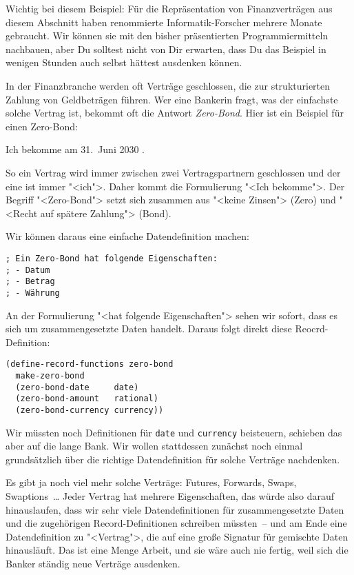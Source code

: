 Wichtig bei diesem Beispiel: Für die Repräsentation von
Finanzverträgen aus diesem Abschnitt haben renommierte
Informatik-Forscher mehrere Monate gebraucht.  Wir können sie mit den
bisher präsentierten Programmiermitteln nachbauen, aber Du solltest
nicht von Dir erwarten, dass Du das Beispiel in wenigen Stunden auch
selbst hättest ausdenken können.

In der Finanzbranche werden oft Verträge geschlossen, die zur
strukturierten Zahlung von Geldbeträgen führen.  Wer eine Bankerin
fragt, was der einfachste solche Vertrag ist, bekommt oft die Antwort
\textit{Zero-Bond}.  Hier ist ein Beispiel für einen Zero-Bond:
%
\begin{center}
  Ich bekomme am 31.\ Juni 2030 .
\end{center}
%
So ein Vertrag wird immer zwischen zwei Vertragspartnern geschlossen und der
eine ist immer "<ich">.  Daher kommt die Formulierung "<Ich
bekomme">.  Der Begriff "<Zero-Bond"> setzt sich zusammen aus "<keine
Zinsen"> (Zero) und "<Recht auf spätere Zahlung"> (Bond).

Wir können daraus eine einfache Datendefinition machen:
%
\begin{lstlisting}
; Ein Zero-Bond hat folgende Eigenschaften:
; - Datum
; - Betrag
; - Währung
\end{lstlisting}
%
An der Formulierung "<hat folgende Eigenschaften"> sehen wir sofort,
dass es sich um zusammengesetzte Daten handelt.  Daraus folgt direkt
diese Reocrd-Definition:
%
\begin{lstlisting}
(define-record-functions zero-bond
  make-zero-bond
  (zero-bond-date     date)
  (zero-bond-amount   rational)
  (zero-bond-currency currency))
\end{lstlisting}
%
Wir müssten noch Definitionen für \texttt{date} und \texttt{currency}
beisteuern, schieben das aber auf die lange Bank.  Wir wollen
stattdessen zunächst noch einmal grundsätzlich über die richtige
Datendefinition für solche Verträge nachdenken.

Es gibt ja noch viel mehr solche Verträge: Futures, Forwards, Swaps,
Swaptions~\ldots{} Jeder Vertrag hat mehrere Eigenschaften, das würde
also darauf hinauslaufen, dass wir sehr viele Datendefinitionen für
zusammengesetzte Daten und die zugehörigen Record-Definitionen
schreiben müssten~-- und am Ende eine Datendefinition zu "<Vertrag">,
die auf eine große Signatur für gemischte Daten hinausläuft.  Das ist
eine Menge Arbeit, und sie wäre auch nie fertig, weil sich die Banker
ständig neue Verträge ausdenken.

